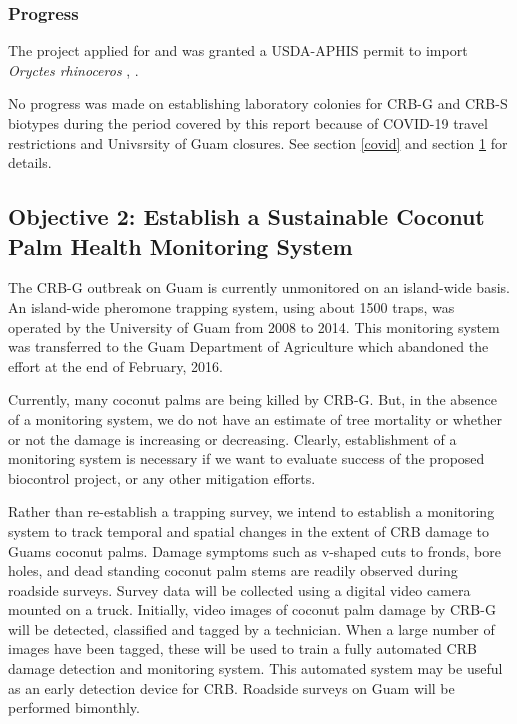 \documentclass[12pt,letterpaper,english,bibliography=totocnumbered,abstract=on]{scrartcl}
\begin{document}
\subsubsection{Progress}



The project applied for and was granted a USDA-APHIS permit to import \textit{Oryctes rhinoceros} \cite{usda-aphis_crb_2019}, \cite{moore_additional_2019}.

No progress was made on establishing laboratory colonies for CRB-G and CRB-S biotypes during the period covered by this report because of COVID-19 travel restrictions and Univsrsity of Guam closures. See section \ref{covid} and section \ref{} for details.


\newpage\begin{framed}
\section{Objective 2: Establish a Sustainable Coconut Palm Health Monitoring System}

The CRB-G outbreak on Guam is currently unmonitored on an island-wide basis. An island-wide pheromone trapping system, using about 1500 traps, was operated by the University of Guam from 2008 to 2014. This monitoring system was transferred to the Guam Department of Agriculture which abandoned the effort at the end of February, 2016.

Currently, many coconut palms are being killed by CRB-G. But, in the absence of a monitoring system, we do not have an estimate of tree mortality or whether or not the damage is increasing or decreasing. Clearly, establishment of a monitoring system is necessary if we want to evaluate success of the proposed biocontrol project, or any other mitigation efforts.

Rather than re-establish a trapping survey, we intend to establish a monitoring system to track temporal and spatial changes in the extent of CRB damage to Guams coconut palms. Damage symptoms such as v-shaped cuts to fronds, bore holes, and dead standing coconut palm stems are readily observed during roadside surveys. Survey data will be collected using a digital video camera mounted on a truck. Initially, video images of coconut palm damage by CRB-G will be detected, classified and tagged by a technician. When a large number of images have been tagged, these will be used to train a fully automated CRB damage detection and monitoring system. This automated system may be useful as an early detection device for CRB. Roadside surveys on Guam will be performed bimonthly.


\end{framed}
\end{document}
